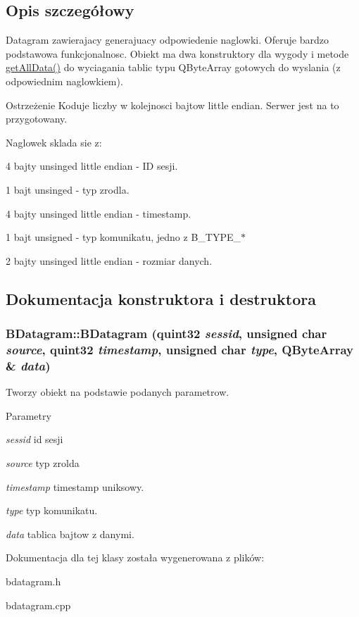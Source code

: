 \subsection{Opis szczegółowy}
Datagram zawierajacy generajuacy odpowiedenie naglowki. Oferuje bardzo podstawowa funkcjonalnosc. Obiekt ma dwa konstruktory dla wygody i metode \hyperlink{class_b_datagram_abf97808c5ae33d46feb4e2f1a920cb4f}{getAllData()} do wyciagania tablic typu QByteArray gotowych do wyslania (z odpowiednim naglowkiem).

\begin{DoxyWarning}{Ostrzeżenie}
Koduje liczby w kolejnosci bajtow little endian. Serwer jest na to przygotowany.
\end{DoxyWarning}
Naglowek sklada sie z: \begin{DoxyItemize}
\item 4 bajty unsinged little endian -\/ ID sesji. \item 1 bajt unsinged -\/ typ zrodla. \item 4 bajty unsinged little endian -\/ timestamp. \item 1 bajt unsigned -\/ typ komunikatu, jedno z B\_\-TYPE\_\-$\ast$ \item 2 bajty unsinged little endian -\/ rozmiar danych. \end{DoxyItemize}


\subsection{Dokumentacja konstruktora i destruktora}
\hypertarget{class_b_datagram_a6a687551e97a36b91c6a40a1c5a374ed}{
\subsubsection[{BDatagram}]{\setlength{\rightskip}{0pt plus 5cm}BDatagram::BDatagram (quint32 {\em sessid}, \/  unsigned char {\em source}, \/  quint32 {\em timestamp}, \/  unsigned char {\em type}, \/  QByteArray \& {\em data})}}
\label{class_b_datagram_a6a687551e97a36b91c6a40a1c5a374ed}


Tworzy obiekt na podstawie podanych parametrow. 


\begin{DoxyParams}{Parametry}
\item[{\em sessid}]id sesji \item[{\em source}]typ zrolda \item[{\em timestamp}]timestamp uniksowy. \item[{\em type}]typ komunikatu. \item[{\em data}]tablica bajtow z danymi. \end{DoxyParams}


Dokumentacja dla tej klasy została wygenerowana z plików:\begin{DoxyCompactItemize}
\item 
bdatagram.h\item 
bdatagram.cpp\end{DoxyCompactItemize}
